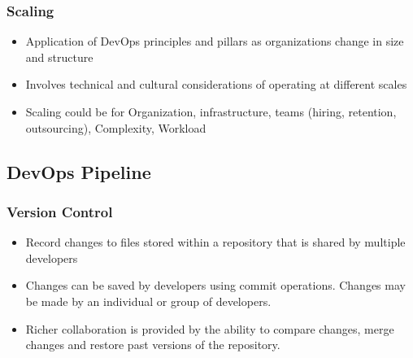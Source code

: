 \documentclass{article}
\begin{document}
\subsubsection{Scaling}
\begin{itemize}
    \item Application of DevOps principles and pillars as organizations change in size and structure 
    
    \item Involves technical and cultural considerations of operating at different scales
    
    \item Scaling could be for Organization, infrastructure, teams (hiring, retention, outsourcing), Complexity, Workload

\end{itemize}

\subsection{DevOps Pipeline}
\subsubsection{Version Control}
\begin{itemize}
    \item Record changes to files stored within a repository that is shared by multiple developers
    
    \item Changes can be saved by developers using commit operations. Changes may be made by an individual or group of developers.
    
    \item Richer collaboration is provided by the ability to compare changes, merge changes and restore past versions of the repository. 
\end{itemize}
\end{document}
